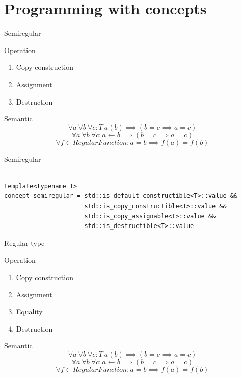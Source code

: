 \documentclass[10pt]{beamer}
\begin{document}
\section{Programming with concepts}
\begin{frame}{Semiregular}
    \begin{block}{Operation}
      \begin{enumerate}
        \item Copy construction
        \item Assignment
        \item Destruction
      \end{enumerate}
    \end{block}

    \begin{block}{Semantic}
        $$\forall a ~ \forall b ~ \forall c : T~a(b)  \implies(b = c \implies a = c)$$
        $$\forall a ~ \forall b ~ \forall c : a \leftarrow b  \implies(b = c \implies a = c)$$
        $$\forall f \in RegularFunction: a = b \implies f(a) = f(b)$$
    \end{block}
\end{frame}

\begin{frame}[fragile]{Semiregular}
\begin{lstlisting}[style=cpp]

template<typename T>
concept semiregular = std::is_default_constructible<T>::value &&
                      std::is_copy_constructible<T>::value &&
                      std::is_copy_assignable<T>::value &&
                      std::is_destructible<T>::value

\end{lstlisting}
\end{frame}

\begin{frame}{Regular type}
\begin{block}{Operation}
  \begin{enumerate}
    \item Copy construction
    \item Assignment
    \item Equality
    \item Destruction
  \end{enumerate}
\end{block}
\begin{block}{Semantic}
    $$\forall a ~ \forall b ~ \forall c : T~a(b)  \implies(b = c \implies a = c)$$
    $$\forall a ~ \forall b ~ \forall c : a \leftarrow b  \implies(b = c \implies a = c)$$
    $$\forall f \in RegularFunction: a = b \implies f(a) = f(b)$$
\end{block}
\end{frame}
\end{document}
